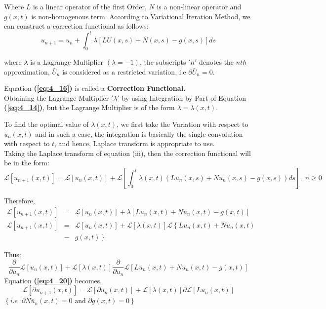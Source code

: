 \documentclass[12pt]{report}
\newcommand{\Laplace}{\mathcal{L}}
\newcommand{\sbracket}[1]{\left[#1\right]}
\newcommand{\Un}[2]{u_{#1}(#2)}
\newcommand{\NI}{\noindent}
\newcommand{\LT}[1]{\Laplace \left[#1\right]}
\newcommand{\bt}[1]{\textbf{#1}}
\newcommand{\refn}[1]{\bt{(\ref{#1})}}
\begin{document}
\NI Where $L$ is a linear operator of the first Order, $N$ is a non-linear operator and $g(x,t)$ is non-homogenous term. According to Variational  Iteration Method, we can construct a correction functional as follows: 
\begin{equation}
	u_{n+1} = u_n + \int_{0}^{t} \lambda \left[ LU(x,s) + N(x,s) - g(x,s) \right] ds \label{eq:4_16}
\end{equation}

\NI where $\lambda$ is a Lagrange Multiplier $(\lambda = -1)$, the subscripts $'n'$ denotes the $nth$ approximation, $\bar{U}_n$ is considered as a restricted variation, i.e $\partial\bar{U}_n = 0$.

\NI Equation \refn{eq:4_16} is called a \textbf{Correction Functional.}\\
Obtaining the Lagrange Multiplier $'\lambda'$ by using Integration by Part of Equation \refn{eq:4_14}, but the Lagrange Multiplier is of the form $\lambda = \lambda(x,t)$.

\NI To find the optimal value of $\lambda(x,t)$, we first take the Variation with respect to $\Un{n}{x,t}$ and in such a case, the integration is basically the single convolution with respect to $t$, and hence, Laplace transform  is appropriate to use.\\

\NI Taking the Laplace transform of equation (iii), then the correction functional will be in the form:\\[0.25cm]
\begin{equation}
	\LT{\Un{n+1}{x,t}} = \LT{\Un{n}{x,t}} + \LT{\int_{0}^{t}\lambda(x,t)\left( L\Un{n}{x,s} + N\Un{n}{x,s} - g(x,s) \right)ds}, \; n \geq 0
\end{equation}

\NI Therefore, 
\begin{eqnarray}
	\LT{\Un{n+1}{x,t}} &=& \LT{\Un{n}{x,t}} + \lambda \sbracket{L\Un{n}{x,t} + N\Un{n}{x,t} - g(x,t)}\\
	\LT{\Un{n+1}{x,t}} &=& \LT{\Un{n}{x,t}} + \LT{\lambda(x,t)} \Laplace\left\{L\Un{n}{x,t} + N\Un{n}{x,t}\right. \nonumber \\
	 &-& \left. g(x,t)\right\}
\end{eqnarray}


\NI Thus;\\
\begin{equation}
	\frac{\partial}{\partial u_n}\LT{\Un{n}{x,t}} + \LT{\lambda(x,t)}\frac{\partial}{\partial u_n}\LT{L\Un{n}{x,t} + N\Un{n}{x,t} - g(x,t)} \label{eq:4_20}
\end{equation}
Equation \refn{eq:4_20} becomes,\\[0.2cm]
\begin{equation}
	\LT{\partial\Un{n+1}{x,t}} = \LT{\partial u_n(x,t)} + \LT{\lambda (x,t)}\partial \LT{L\Un{n}{x,t}} \label{eq:4_21}
\end{equation}
$\displaystyle
\left\{ i.e \; \; \partial N\bar{u}_{n}(x,t) = 0 \text{ and } \partial g(x,t) = 0\right\}
$\\[0.2cm]
\end{document}
